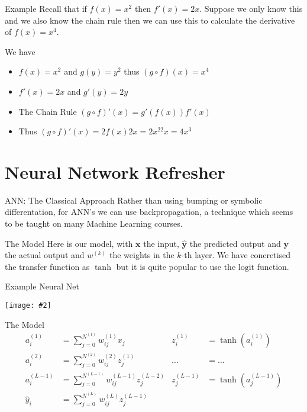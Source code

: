 \documentclass{beamer}
\newcommand {\framedgraphic}[2] {
    \begin{frame}{#1}
        \begin{center}
            \texttt{[image: \#2]}
        \end{center}
    \end{frame}
}
\begin{document}
\begin{frame}[fragile]{Example}
Recall that if $f(x) = x^2$ then $f'(x) = 2x$. Suppose we only know
this and we also know the chain rule then we can use this to calculate
the derivative of $f(x) = x^4$.

We have
\begin{itemize}
\item
$f(x) = x^2$ and $g(y) = y^2$ thus $(g \circ f)(x) = x^4$
\item
$f'(x) = 2x$ and $g'(y) = 2y$
\item
The Chain Rule $(g \circ f)'(x) = g'(f(x))f'(x)$
\item
Thus $(g \circ f)'(x) = 2f(x)2x = 2x^22x = 4x^3$
\end{itemize}
\end{frame}

\section{Neural Network Refresher}

\begin{frame}[fragile]{ANN: The Classical Approach}
Rather than using bumping or symbolic differentation, for ANN's we can
use backpropagation, a technique which seems to be taught on many
Machine Learning courses.
\end{frame}

\begin{frame}[fragile]{The Model}
Here is our model, with $\boldsymbol{x}$ the input,
$\hat{\boldsymbol{y}}$ the predicted output and $\boldsymbol{y}$ the
actual output and $w^{(k)}$ the weights in the $k$-th layer. We have
concretised the transfer function as $\tanh$ but it is quite popular
to use the $\text{logit}$ function.
\end{frame}

\framedgraphic{Example Neural Net}{diagrams/ca75393cd25ce951edcd7133da24a2c6.png}

\begin{frame}[fragile]{The Model}
$$
\begin{aligned}
a_i^{(1)}   &= \sum_{j=0}^{N^{(1)}} w_{ij}^{(1)} x_j       & z_i^{(1)} &= \tanh(a_i^{(1)}) \\
a_i^{(2)}   &= \sum_{j=0}^{N^{(2)}} w_{ij}^{(2)} z_j^{(1)} &  \dots     &= \ldots \\
a_i^{(L-1)} &= \sum_{j=0}^{N^{(L-1)}} w_{ij}^{(L-1)} z_j^{(L-2)} & z_j^{(L-1)} &= \tanh(a_j^{(L-1)}) \\
\hat{y}_i  &= \sum_{j=0}^{N^{(L)}} w_{ij}^{(L)} z_j^{(L-1)} \\
\end{aligned}
$$
\end{frame}
\end{document}
